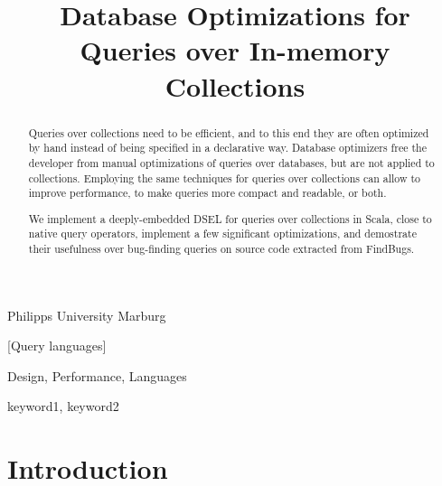 \documentclass[preprint,authoryear,10pt]{sigplanconf}
\begin{document}
\copyrightdata{[to be supplied]} 


\title{Database Optimizations for Queries over In-memory Collections}

	   {Philipps University Marburg}

\maketitle

\begin{abstract}
Queries over collections need to be efficient, and to this end they are often optimized by hand instead of
being specified in a declarative way. Database optimizers free the developer from manual optimizations of queries
over databases, but are not applied to collections. Employing the same techniques for queries over collections can
allow to improve performance, to make queries more compact and readable, or both.

We implement a deeply-embedded DSEL for queries over collections in Scala, close to native query operators,
implement a few significant optimizations, and demostrate their usefulness over bug-finding queries on source code
extracted from FindBugs.
\end{abstract}

[Query languages]

\terms
Design, Performance, Languages

\keywords
keyword1, keyword2




\section{Introduction}
\end{document}
